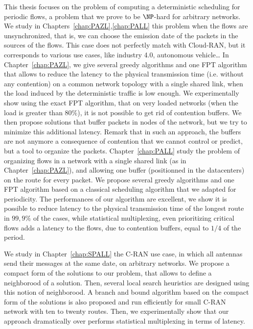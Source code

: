  This thesis focuses on the problem of computing a deterministic scheduling for periodic flows, a problem that we prove to be $\NP$-hard for arbitrary networks.
 We study in Chapters~\ref{chap:PAZL},\ref{chap:PALL} this problem when the flows are unsynchronized, that is, we can choose the emission date of the packets in the sources of the flows. This case does not perfectly match with Cloud-RAN, but it corresponds to various use cases, like industry 4.0, autonomous vehicle\dots
In Chapter~\ref{chap:PAZL}, we give several greedy algorithms and one FPT algorithm that allows to reduce the latency to the physical transmission time (i.e. without any contention) on a common network topology with a single shared link, when the load induced by the deterministic traffic is low enough. We experimentally show using the exact FPT algorithm, that on very loaded networks (when the load is greater than $80\%$), it is not possible to get rid of contention buffers. 
We then propose solutions that buffer packets in nodes of the network, but we try to minimize this additional latency. Remark that in such an approach, the buffers are not anymore a consequence of contention that we cannot control or predict, but a tool to organize the packets.
Chapter~\ref{chap:PALL} study the problem of organizing flows in a network with a single shared link (as in Chapter~\ref{chap:PAZL}), and allowing one buffer (positionned in the datacenters) on the route for every packet. We propose several greedy algorithms and one FPT algorithm based on a classical scheduling algorithm that we adapted for periodicity. The performances of our algorithm are excellent, we show it is possible to reduce latency to the physical transmission time of the longest route in $99,9\%$ of the cases, while statistical multiplexing, even prioritizing critical flows adds a latency to the flows, due to contention buffers, equal to $1/4$ of the period.

We study in Chapter~\ref{chap:SPALL} the C-RAN use case, in which all antennas send their messages at the same date, on arbitrary networks. We propose a compact form of the solutions to our problem, that allows to define a neighborood of a solution. Then, several local search heuristics are designed using this notion of neighborood. A branch and bound algorithm based 
on the compact form of the solutions is also proposed and run efficiently for small C-RAN network with ten to twenty routes. Then, we experimentally show that our approach dramatically over performs statistical multiplexing in terms of latency.

